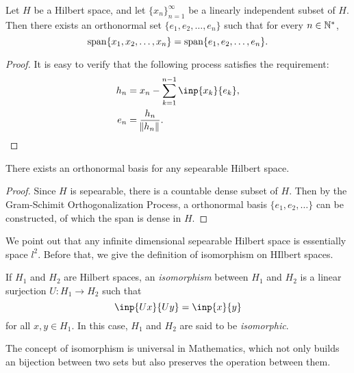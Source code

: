 \begin{thm}
\label{thm:hilbert_spaces:gram_schimit_orthogonalization}
Let $H$ be a Hilbert space, and let $\{ x_n \}_{n=1}^{\infty}$ be a linearly 
independent subset of $H$. 
Then there exists an orthonormal set $\{e_1, e_2, \ldots, e_n\}$ such that 
for every $n \in \mathbb{N}^\ast$, 
\begin{equation*}
    \operatorname{span}\{x_1, x_2, \ldots, x_n\} = \operatorname{span}\{e_1, e_2, \ldots, e_n\}.
\end{equation*}
\end{thm}
\begin{proof}
It is easy to verify that the following process satisfies the requirement:
\begin{equation*}
    \begin{aligned}
        h_n &= x_n - \sum_{k=1}^{n-1} \inp{x_k}{e_k}, \\
        e_n &= \frac{h_n}{\norm{h_n}}.
    \end{aligned}
\end{equation*}
\end{proof}

\begin{cor}
There exists an orthonormal basis for any sepearable Hilbert space. 
\end{cor}
\begin{proof}
Since $H$ is sepearable, there is a countable dense subset of $H$. 
Then by the Gram-Schimit Orthogonalization Process, a orthonormal basis 
$\{e_1, e_2, \ldots\}$ can be constructed, of which the span is dense in 
$H$.  
\end{proof}

We point out that any infinite dimensional sepearable Hilbert space is 
essentially space $l^2$. 
Before that, we give the definition of isomorphism on HIlbert spaces. 
\begin{defn}
If $H_1$ and $H_2$ are Hilbert spaces, an \emph{isomorphism} between $H_1$ 
and $H_2$ is a linear surjection $U: H_1 \to H_2$ such that 
\begin{equation*}
    \inp{Ux}{Uy} = \inp{x}{y}
\end{equation*}
for all $x, y \in H_1$. 
In this case, $H_1$ and $H_2$ are said to be \emph{isomorphic}. 
\end{defn}

The concept of isomorphism is universal in Mathematics, which not only 
builds an bijection between two sets but also preserves the operation 
between them. 

